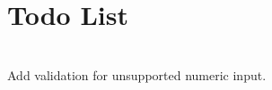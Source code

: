 \chapter{Todo List }
\hypertarget{todo}{}\label{todo}

\begin{DoxyRefList}
\item[{\parbox[t]{\linewidth}{Member \doxylink{class_calculation_engine_a19d4dd01a764735328b503a531be8ce0}{Calculation\+Engine::power} (double base, int exponent) const}}]\hfill \\
\label{todo__todo000001}%
%
Add validation for unsupported numeric input. 
\end{DoxyRefList}